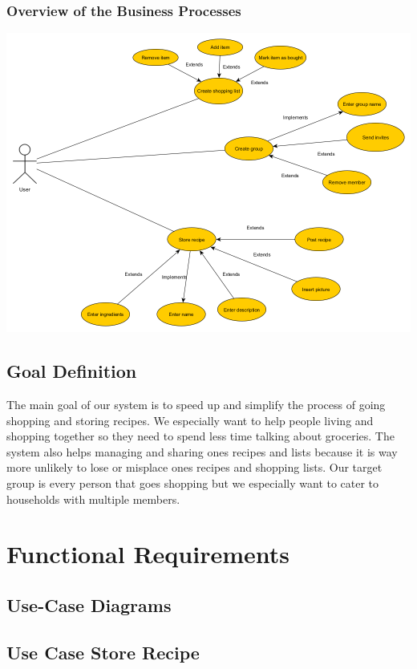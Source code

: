 \documentclass[12pt]{article}
\theoremstyle{definition}
\begin{document}
\subsubsection{Overview of the Business Processes}

\includegraphics[scale=.5]{UseCase.png}

\subsection{Goal Definition}

The main goal of our system is to speed up and simplify the process of going shopping and storing recipes. We especially want to help people living and shopping together so they need to spend less time talking about groceries. The system also helps managing and sharing ones recipes and lists because it is way more unlikely to lose or misplace ones recipes and shopping lists.
Our target group is every person that goes shopping but we especially want to cater to households with multiple members.

\pagebreak

\section{Functional Requirements}

\subsection{Use-Case Diagrams}

\subsection{Use Case Store Recipe}
\end{document}
